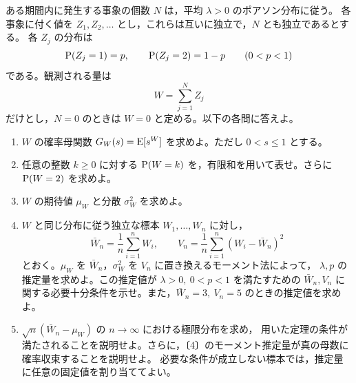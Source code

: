 \documentclass[a4paper,11pt]{ltjsarticle}
\begin{document}
ある期間内に発生する事象の個数 $N$ は，平均 $\lambda>0$ のポアソン分布に従う。
各事象に付く値を $Z_1,Z_2,\ldots$ とし，これらは互いに独立で，$N$ とも独立であるとする。
各 $Z_j$ の分布は
\[
\operatorname{P}(Z_j=1)=p,\qquad \operatorname{P}(Z_j=2)=1-p\qquad(0<p<1)
\]
である。観測される量は
\[
W=\sum_{j=1}^{N} Z_j
\]
だけとし，$N=0$ のときは $W=0$ と定める。以下の各問に答えよ。
\begin{enumerate}
\item $W$ の確率母関数 $G_W(s)=\operatorname{E}[s^W]$ を求めよ。ただし $0<s\leq1$ とする。
\item 任意の整数 $k\geq0$ に対する $\operatorname{P}(W=k)$ を，有限和を用いて表せ。さらに $\operatorname{P}(W=2)$ を求めよ。
\item $W$ の期待値 $\mu_W$ と分散 $\sigma_W^2$ を求めよ。
\item $W$ と同じ分布に従う独立な標本 $W_1,\ldots,W_n$ に対し，
\[
\bar W_n=\frac1n\sum_{i=1}^nW_i,\qquad
V_n=\frac1n\sum_{i=1}^n(W_i-\bar W_n)^2
\]
とおく。$\mu_W$ を $\bar W_n$，$\sigma_W^2$ を $V_n$ に置き換えるモーメント法によって，
$\lambda,p$ の推定量を求めよ。この推定値が $\lambda>0,\ 0<p<1$ を満たすための
$\bar W_n,V_n$ に関する必要十分条件を示せ。また，$\bar W_n=3,\ V_n=5$ のときの推定値を求めよ。
\item $\sqrt n(\bar W_n-\mu_W)$ の $n\to\infty$ における極限分布を求め，
用いた定理の条件が満たされることを説明せよ。さらに，〔4〕のモーメント推定量が真の母数に確率収束することを説明せよ。
必要な条件が成立しない標本では，推定量に任意の固定値を割り当ててよい。
\end{enumerate}
\newpage
\end{document}
